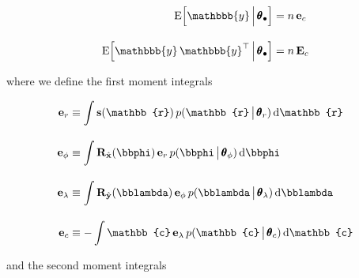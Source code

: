 \documentclass[modern,linenumbers]{aastex62}
\begin{document}
%
\begin{linenomath}\begin{align}
        \label{eq:exp_y_sep}
        \mathrm{E} \Big[ \mathbbb{y} \, \Big| \, \pmb{\theta}_\bullet \Big]
         & =
        n \, \mathbf{e}_c
        \\[1em]
        \label{eq:exp_yy_sep}
        \mathrm{E} \Big[ \mathbbb{y} \, \mathbbb{y}^\top \, \Big| \, \pmb{\theta}_\bullet \Big]
         & =
        n \, \mathbf{E}_c
    \end{align}\end{linenomath}
%
where we define the first moment integrals
%
\begin{linenomath}\begin{align}
        \label{eq:e1}
        \mathbf{e}_r
         & \equiv
        \int
        \mathbf{s}(\mathbb{r}) \,
        p(\mathbb{r} \, \big| \, \pmb{\theta}_{r}) \,
        \mathrm{d}\mathbb{r}
        \\[1em]
        \label{eq:e2}
        \mathbf{e}_\phi
         & \equiv
        \int
        \mathbf{R}_{\hat{\mathbf{x}}}(\bbphi) \,
        \mathbf{e}_r \,
        p(\bbphi \, \big| \, \pmb{\theta}_{\phi}) \,
        \mathrm{d}\bbphi
        \\[1em]
        \label{eq:e3}
        \mathbf{e}_\lambda
         & \equiv
        \int
        \mathbf{R}_{\hat{\mathbf{y}}}(\bblambda) \,
        \mathbf{e}_\phi \,
        p(\bblambda \, \big| \, \pmb{\theta}_{\lambda}) \,
        \mathrm{d}\bblambda
        \\[1em]
        \label{eq:e4}
        \mathbf{e}_c
         & \equiv
        -
        \int
        \mathbb{c} \,
        \mathbf{e}_\lambda \,
        p(\mathbb{c} \, \big| \, \pmb{\theta}_{c}) \,
        \mathrm{d}\mathbb{c}
    \end{align}\end{linenomath}
%
and the second moment integrals
%
\end{document}
